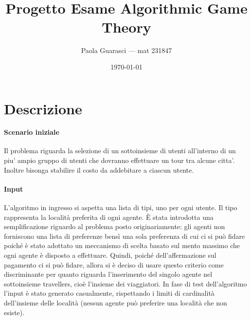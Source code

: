 \documentclass{article}
\title{Progetto Esame Algorithmic Game Theory}
\author{Paola Guarasci --- mat 231847}
\date{\today}
\begin{document}
\maketitle


\section*{Descrizione}
\paragraph*{Scenario iniziale}
Il problema riguarda la selezione di un sottoinsieme di utenti all'interno di un piu' ampio gruppo di utenti che dovranno effettuare un tour tra alcune citta'. Inoltre bisonga stabilire il costo da addebitare a ciascun utente.
\paragraph*{Input}
L'algoritmo in ingresso si aspetta una lista di tipi, uno per ogni utente. Il tipo rappresenta la località preferita di ogni agente. È stata introdotta una semplificazione riguardo al problema posto originariamente: gli agenti non forniscono una lista di preferenze bensì una sola preferenza di cui ci si può fidare poiché è stato adottato un meccanismo di scelta basato sul mento massimo che ogni agente è disposto a effettuare. Quindi, poiché dell'affermazione sul pagamento ci si può fidare, allora si è deciso di usare questo criterio come discriminante per quanto riguarda l'inserimento del singolo agente nel sottoinsieme travellers, cioè l'insieme dei viaggiatori.
In fase di test dell'algoritmo l'input è stato generato casualmente, rispettando i limiti di cardinalità dell'insieme delle località (nessun agente può preferire una località che non esiste).
\end{document}
